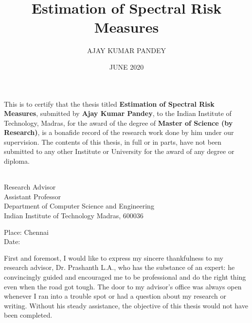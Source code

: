 

\title{Estimation of Spectral Risk Measures}
\author{AJAY KUMAR PANDEY}

\date{JUNE 2020}

\maketitle
\label{key}
\certificate

\vspace*{0.5in}

\noindent This is to certify that the thesis titled {\bf Estimation of Spectral Risk Measures}, submitted by {\bf Ajay Kumar Pandey}, 
  to the Indian Institute of Technology, Madras, for
the award of the degree of {\bf Master of Science (by Research)}, is a bonafide
record of the research work done by him under our supervision.  The
contents of this thesis, in full or in parts, have not been submitted
to any other Institute or University for the award of any degree or
diploma.

\vspace*{1.5in}

\begin{singlespacing}
\hspace*{-0.25in}
\parbox{5in}{
 \\
\noindent Research Advisor \\ 
\noindent Assistant Professor \\
\noindent Department of Computer Science and Engineering\\
\noindent Indian Institute of Technology Madras, 600036 \\
} 

\end{singlespacing}
\vspace*{0.25in}

\noindent Place: Chennai\\
Date: 


\acknowledgements

First and foremost, I would like to express my sincere thankfulness to my research advisor, Dr. Prashanth L.A., who has the substance of an expert: he convincingly guided and encouraged me to be professional and do the right thing even when the road got tough. The door to my advisor's office was always open whenever I ran into a trouble spot or had a question about my research or writing. Without his steady assistance, the objective of this thesis would not have been completed.

